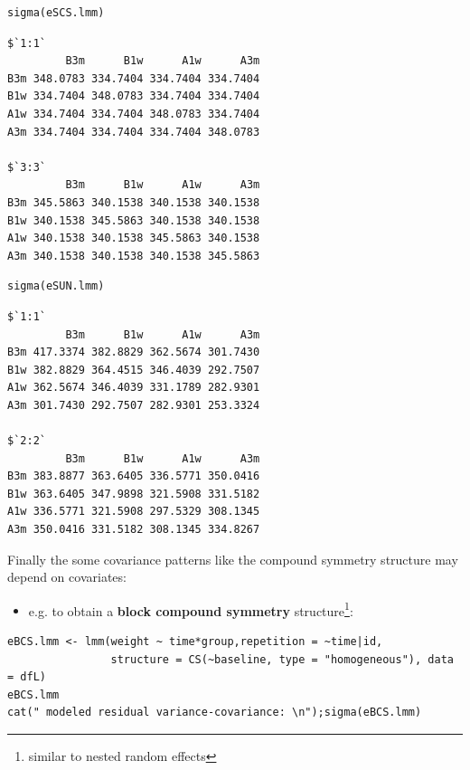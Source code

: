 \documentclass[12pt]{article}
\begin{document}
\begin{minipage}{0.47\linewidth}
\lstset{language=r,label= ,caption= ,captionpos=b,numbers=none}
\begin{lstlisting}
sigma(eSCS.lmm)
\end{lstlisting}

\begin{verbatim}
$`1:1`
         B3m      B1w      A1w      A3m
B3m 348.0783 334.7404 334.7404 334.7404
B1w 334.7404 348.0783 334.7404 334.7404
A1w 334.7404 334.7404 348.0783 334.7404
A3m 334.7404 334.7404 334.7404 348.0783

$`3:3`
         B3m      B1w      A1w      A3m
B3m 345.5863 340.1538 340.1538 340.1538
B1w 340.1538 345.5863 340.1538 340.1538
A1w 340.1538 340.1538 345.5863 340.1538
A3m 340.1538 340.1538 340.1538 345.5863
\end{verbatim}
\end{minipage}
\begin{minipage}{0.47\linewidth}
\lstset{language=r,label= ,caption= ,captionpos=b,numbers=none}
\begin{lstlisting}
sigma(eSUN.lmm)
\end{lstlisting}

\begin{verbatim}
$`1:1`
         B3m      B1w      A1w      A3m
B3m 417.3374 382.8829 362.5674 301.7430
B1w 382.8829 364.4515 346.4039 292.7507
A1w 362.5674 346.4039 331.1789 282.9301
A3m 301.7430 292.7507 282.9301 253.3324

$`2:2`
         B3m      B1w      A1w      A3m
B3m 383.8877 363.6405 336.5771 350.0416
B1w 363.6405 347.9898 321.5908 331.5182
A1w 336.5771 321.5908 297.5329 308.1345
A3m 350.0416 331.5182 308.1345 334.8267
\end{verbatim}
\end{minipage}

\clearpage

\noindent Finally the some covariance patterns like the compound
symmetry structure may depend on covariates:
\begin{itemize}
\item e.g. to obtain a \textbf{block compound symmetry} structure\footnote{similar to
nested random effects}:
\end{itemize}
\lstset{language=r,label= ,caption= ,captionpos=b,numbers=none}
\begin{lstlisting}
eBCS.lmm <- lmm(weight ~ time*group,repetition = ~time|id,
                structure = CS(~baseline, type = "homogeneous"), data = dfL)
eBCS.lmm
cat(" modeled residual variance-covariance: \n");sigma(eBCS.lmm)
\end{lstlisting}
\end{document}
